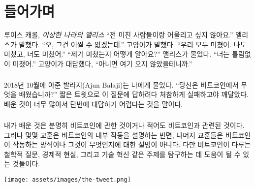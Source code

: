 \chapter*{들어가며}
\label{ch:introduction}

\begin{chapquote}{루이스 캐롤, \textit{이상한 나라의 앨리스}}
	\enquote{전 미친 사람들이랑 어울리고 싶지 않아요.} 앨리스가 말했다. 
	\enquote{오, 그건 어쩔 수 없겠는데.}  고양이가 말했다. 
	\enquote{우리 모두 미쳤어. 나도 미쳤고, 너도 미쳤어.} 
	\enquote{제가 미쳤는지 어떻게 알아요?} 앨리스가 물었다. 
	\enquote{너는 틀림없이 미쳤어.} 고양이가 대답했다, 
	\enquote{아니면 여기 오지 않았을테니까.}
\end{chapquote}


\paragraph{}
2018년 10월에 아준 발라지(Ajun Balaji)는 나에게 물었다.
\enquote{당신은 비트코인에서 무엇을 배웠습니까?} 짧은 트윗으로 이 질문에 답하려다 처참하게 실패하고야 깨달았다.
배운 것이 너무 많아서 단번에 대답하기 어렵다는 것을 말이다.

\paragraph{}
내가 배운 것은 분명히 비트코인에 관한 것이거나 적어도 비트코인과 관련된 것이다. 
그러나 몇몇 교훈은 비트코인의 내부 작동을 설명하는 반면, 나머지 교훈들은 
비트코인이 작동하는 방식이나 그것이 무엇인지에 대한 설명이 아니다.
다만 비트코인이 다루는 철학적 질문, 경제적 현실, 그리고 기술 혁신 같은 주제를 탐구하는 데 도움이 될 수 있는 것들이다. 

\begin{center}
	\texttt{[image: assets/images/the-tweet.png]}
\end{center}

